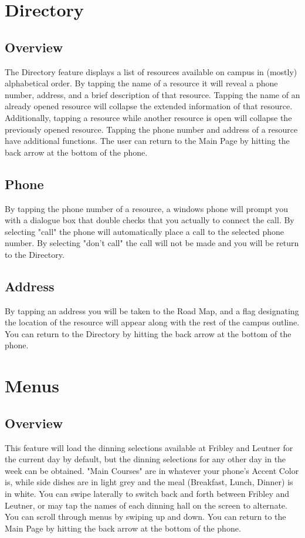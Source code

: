 \documentclass[pdftex,12pt,letter]{article}
\begin{document}
\section{Directory}
\subsection{Overview}
The Directory feature displays a list of resources available on campus in (mostly) alphabetical order. By tapping the name of a resource it will reveal a phone number, address, and a brief description of that resource. Tapping the name of an already opened resource will collapse the extended information of that resource. Additionally, tapping a resource while another resource is open will collapse the previously opened resource. Tapping the phone number and address of a resource have additional functions. The user can return to the Main Page by hitting the back arrow at the bottom of the phone.
\subsection{Phone}
By tapping the phone number of a resource, a windows phone will prompt you with a dialogue box that double checks that you actually to connect the call. By selecting "call" the phone will automatically place a call to the selected phone number. By selecting "don't call" the call will not be made and you will be return to the Directory.
\subsection{Address}
By tapping an address you will be taken to the Road Map, and a flag designating the location of the resource will appear along with the rest of the campus outline. You can return to the Directory by hitting the back arrow at the bottom of the phone.

\section{Menus}
\subsection{Overview}
This feature will load the dinning selections available at Fribley and Leutner for the current day by default, but the dinning selections for any other day in the week can be obtained. "Main Courses" are in whatever your phone's Accent Color is, while side dishes are in light grey and the meal (Breakfast, Lunch, Dinner) is in white. You can swipe laterally to switch back and forth between Fribley and Leutner, or may tap the names of each dinning hall on the screen to alternate. You can scroll through menus by swiping up and down. You can return to the Main Page by hitting the back arrow at the bottom of the phone.
\end{document}
